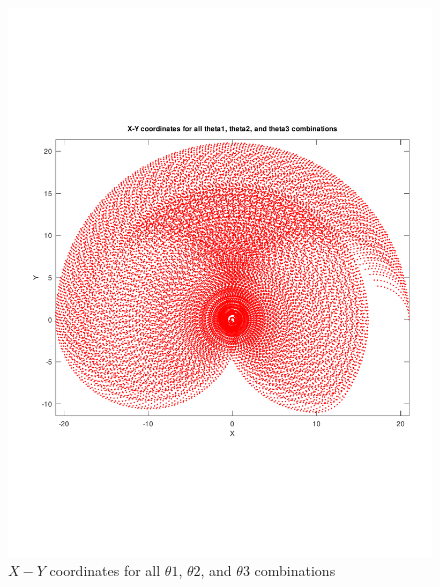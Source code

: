 \documentclass[12pt]{article}
\begin{document}
\begin{figure}
\caption{$X - Y$ coordinates for all $\theta 1$, $\theta 2$, and $\theta 3$ combinations}
\centering
\includegraphics[width=\textwidth]{Inverse Kinematics.pdf} 
\end{figure}

 
\end{document}
